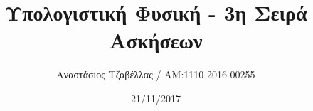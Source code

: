 \documentclass[11pt]{article}
\begin{document}
\title{Υπολογιστική Φυσική - 3η Σειρά Ασκήσεων}
\author{Αναστάσιος Τζαβέλλας / ΑΜ:1110 2016 00255}
\date{21/11/2017}
\maketitle












\end{document}
